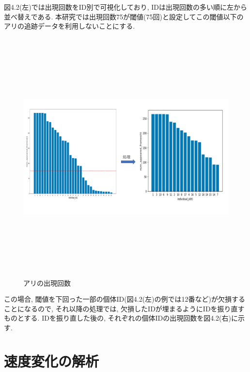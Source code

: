 ﻿\documentclass[a4paper, 12pt]{jsreport}
\begin{document}
図4.2(左)では出現回数をID別で可視化しており, IDは出現回数の多い順に左から並べ替えである. 本研究では出現回数75が閾値(75回)と設定してこの閾値以下のアリの追跡データを利用しないことにする. 
\begin{figure}[tbp]
\centering
\includegraphics[width=13cm,height=13cm,  keepaspectratio]{existenc.pdf}
\caption[Short figure caption for List of Figures]{アリの出現回数}
\label{fig:paper1_fig9}
\end{figure}
この場合, 閾値を下回った一部の個体ID(図4.2(左)の例では12番など)が欠損することになるので, それ以降の処理では, 欠損したIDが埋まるようにIDを振り直すものとする. IDを振り直した後の, それぞれの個体IDの出現回数を図4.2(右)に示す. 



\section{速度変化の解析}
\label{sec:analys}
\end{document}
